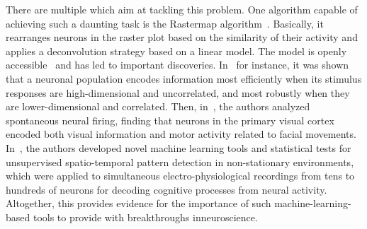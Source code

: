 \documentclass[brainsci, %
               review,accept,pdftex,moreauthors %
               ]{Definitions/mdpi}
\providecommand{\DIFadd}[1]{{\protect\color{blue}\uwave{#1}}} %
\providecommand{\DIFaddbegin}{} %
\providecommand{\DIFaddend}{} %
\providecommand{\DIFdelbegin}{} %
\providecommand{\DIFdelend}{} %
\newcommand{\DIFscaledelfig}{0.5}
\newlength{\DIFdelgraphicswidth} %
\newlength{\DIFdelgraphicsheight} %
\newcommand{\DIFaddincludegraphics}[2][]{{\color{blue}\fbox{\DIFOincludegraphics[#1]{#2}}}} %
\newcommand{\DIFdelincludegraphics}[2][]{%
\sbox{\DIFdelgraphicsbox}{\DIFOincludegraphics[#1]{#2}}%
\settoboxwidth{\DIFdelgraphicswidth}{\DIFdelgraphicsbox} %
\settoboxtotalheight{\DIFdelgraphicsheight}{\DIFdelgraphicsbox} %
\scalebox{\DIFscaledelfig}{%
\parbox[b]{\DIFdelgraphicswidth}{\usebox{\DIFdelgraphicsbox}\\[-\baselineskip] \rule{\DIFdelgraphicswidth}{0em}}\llap{\resizebox{\DIFdelgraphicswidth}{\DIFdelgraphicsheight}{%
\setlength{\unitlength}{\DIFdelgraphicswidth}%
\begin{picture}(1,1)%
\thicklines\linethickness{2pt} %
{\color[rgb]{1,0,0}\put(0,0){\framebox(1,1){}}}%
{\color[rgb]{1,0,0}\put(0,0){\line( 1,1){1}}}%
{\color[rgb]{1,0,0}\put(0,1){\line(1,-1){1}}}%
\end{picture}%
}\hspace*{3pt}}} %
} %
\DeclareRobustCommand{\DIFaddbegin}{\DIFOaddbegin \let\includegraphics\DIFaddincludegraphics} %
\DeclareRobustCommand{\DIFaddend}{\DIFOaddend \let\includegraphics\DIFOincludegraphics} %
\DeclareRobustCommand{\DIFdelbegin}{\DIFOdelbegin \let\includegraphics\DIFdelincludegraphics} %
\DeclareRobustCommand{\DIFdelend}{\DIFOaddend \let\includegraphics\DIFOincludegraphics} %
\begin{document}
There are multiple  which aim at tackling this problem. One algorithm capable of achieving such a daunting task is the Rastermap algorithm~\citep{pachitariu_robustness_2018}. Basically, it rearranges neurons in the raster plot based on the similarity of their activity and applies a deconvolution strategy based on a linear model. \DIFdelbegin %
\DIFdelend \DIFaddbegin {} \DIFaddend The model is openly accessible~\citep{stringer_mouselandrastermap_2020} and has led to important discoveries. In~\citep{stringer_spontaneous_2019} for instance, it was shown that a neuronal population encodes information most efficiently when its stimulus responses are high-dimensional and uncorrelated, and most robustly when they are lower-dimensional and correlated. Then, in~\citep{stringer_high-precision_2021}, the authors analyzed spontaneous neural firing, finding that neurons in the primary visual cortex encoded both visual information and motor activity related to facial movements. In~\citep{russo_cell_2017}, the authors developed novel machine learning tools and statistical tests for unsupervised spatio-temporal pattern detection in non-stationary environments, which were applied to simultaneous electro-physiological recordings from tens to hundreds of neurons for decoding cognitive processes from neural activity. Altogether, this provides evidence for the importance of such machine-learning-based tools to provide with breakthroughs in\DIFaddbegin \DIFadd{~}\DIFaddend neuroscience.
\end{document}
